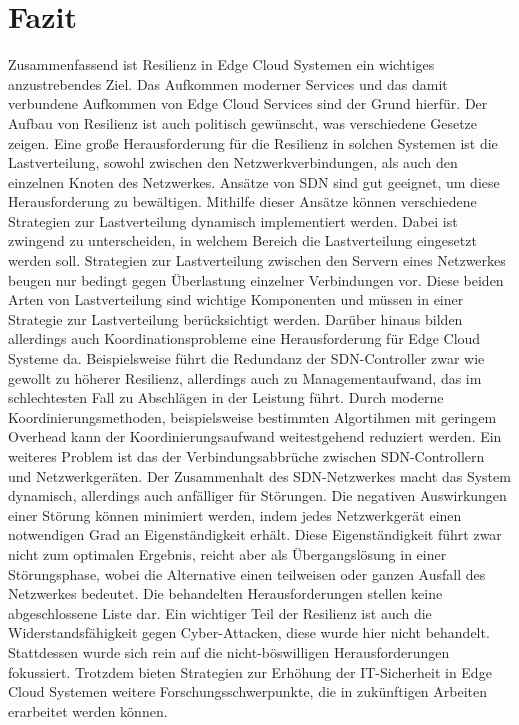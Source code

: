 \section{Fazit}

Zusammenfassend ist Resilienz in Edge Cloud Systemen ein wichtiges anzustrebendes Ziel. Das Aufkommen moderner Services und das damit verbundene Aufkommen von Edge Cloud Services sind der Grund hierfür. 
Der Aufbau von Resilienz ist auch politisch gewünscht, was verschiedene Gesetze zeigen. Eine große Herausforderung für die Resilienz in solchen Systemen ist die Lastverteilung, sowohl zwischen den Netzwerkverbindungen, 
als auch den einzelnen Knoten des Netzwerkes. Ansätze von \ac{SDN} sind gut geeignet, um diese Herausforderung zu bewältigen. 
Mithilfe dieser Ansätze können verschiedene Strategien zur Lastverteilung dynamisch implementiert werden. Dabei ist zwingend zu unterscheiden, in welchem Bereich die Lastverteilung eingesetzt werden soll. 
Strategien zur Lastverteilung zwischen den Servern eines Netzwerkes beugen nur bedingt gegen Überlastung einzelner Verbindungen vor. 
Diese beiden Arten von Lastverteilung sind wichtige Komponenten und müssen in einer Strategie zur Lastverteilung berücksichtigt werden. 
Darüber hinaus bilden allerdings auch Koordinationsprobleme eine Herausforderung für Edge Cloud Systeme da. Beispielsweise führt die Redundanz der \ac{SDN}-Controller zwar wie gewollt zu höherer Resilienz, 
allerdings auch zu Managementaufwand, das im schlechtesten Fall zu Abschlägen in der Leistung führt. Durch moderne Koordinierungsmethoden, 
beispielsweise bestimmten Algortihmen mit geringem Overhead kann der Koordinierungsaufwand weitestgehend reduziert werden. Ein weiteres Problem ist das der Verbindungsabbrüche zwischen \ac{SDN}-Controllern und Netzwerkgeräten. 
Der Zusammenhalt des \ac{SDN}-Netzwerkes macht das System dynamisch, allerdings auch anfälliger für Störungen. Die negativen Auswirkungen einer Störung können minimiert werden, 
indem jedes Netzwerkgerät einen notwendigen Grad an Eigenständigkeit erhält. Diese Eigenständigkeit führt zwar nicht zum optimalen Ergebnis, reicht aber als Übergangslösung in einer Störungsphase, 
wobei die Alternative einen teilweisen oder ganzen Ausfall des Netzwerkes bedeutet. Die behandelten Herausforderungen stellen keine abgeschlossene Liste dar. 
Ein wichtiger Teil der Resilienz ist auch die Widerstandsfähigkeit gegen Cyber-Attacken, diese wurde hier nicht behandelt. Stattdessen wurde sich rein auf die nicht-böswilligen Herausforderungen fokussiert. 
Trotzdem bieten Strategien zur Erhöhung der \ac{IT}-Sicherheit in Edge Cloud Systemen weitere Forschungsschwerpunkte, die in zukünftigen Arbeiten erarbeitet werden können.
